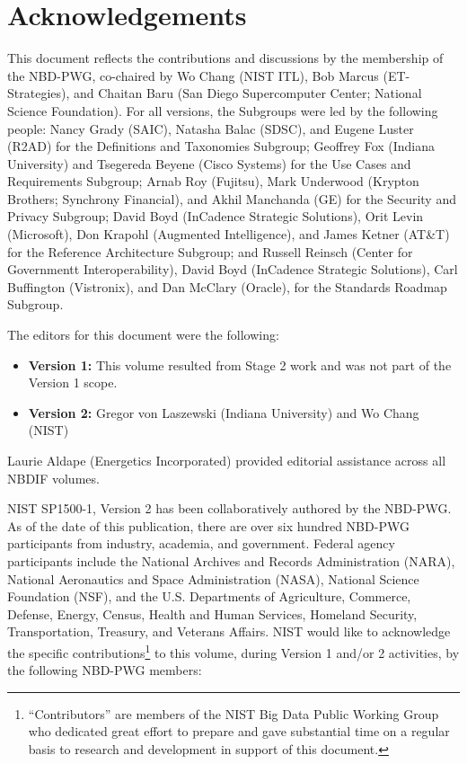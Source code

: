 \section*{\hfill Acknowledgements \hfill}

This document reflects the contributions and discussions by the membership of the NBD-PWG, co-chaired by Wo Chang (NIST ITL), Bob Marcus (ET-Strategies), and Chaitan Baru (San Diego Supercomputer Center; National Science Foundation). For all versions, the Subgroups were led by the following people: Nancy Grady (SAIC), Natasha Balac (SDSC), and Eugene Luster (R2AD) for the Definitions and Taxonomies Subgroup; Geoffrey Fox (Indiana University) and Tsegereda Beyene (Cisco Systems) for the Use Cases and Requirements Subgroup; Arnab Roy (Fujitsu), Mark Underwood (Krypton Brothers; Synchrony Financial), and Akhil Manchanda (GE) for the Security and Privacy Subgroup; David Boyd (InCadence Strategic Solutions), Orit Levin (Microsoft), Don Krapohl (Augmented Intelligence), and James Ketner (AT\&T) for the Reference Architecture Subgroup; and Russell Reinsch (Center for Governmentt Interoperability), David Boyd (InCadence Strategic Solutions), Carl Buffington (Vistronix), and Dan McClary (Oracle), for the Standards Roadmap Subgroup.

The editors for this document were the following: 

\begin{itemize} 

\item {\bf Version 1:} This volume resulted from Stage 2 work and was
  not part of the Version 1 scope.

\item {\bf Version 2:} Gregor von Laszewski (Indiana University) and
  Wo Chang (NIST) \end{itemize}

Laurie Aldape (Energetics Incorporated) provided editorial assistance
across all NBDIF volumes.

NIST SP1500-1, Version 2 has been collaboratively authored by the NBD-PWG. As of the date of this publication, there are over six hundred NBD-PWG participants from industry, academia, and government. Federal agency participants include the National Archives and Records Administration (NARA), National Aeronautics and Space Administration (NASA), National Science Foundation (NSF), and the U.S. Departments of Agriculture, Commerce, Defense, Energy, Census, Health and Human Services, Homeland Security, Transportation, Treasury, and Veterans Affairs.  NIST would like to acknowledge the specific contributions\footnote{``Contributors'' are members of the NIST Big Data Public Working Group who dedicated great effort to prepare and gave substantial time on a regular basis to research and development in support of this document.} to this volume, during Version 1 and/or 2 activities, by the following NBD-PWG members:

